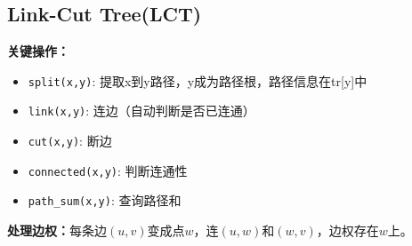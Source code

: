 \documentclass[a4paper,fontset=none]{ctexart}
\begin{document}
\subsection{Link-Cut Tree(LCT)}
\textbf{关键操作：}
\begin{itemize}
\item \texttt{split(x,y)}: 提取x到y路径，y成为路径根，路径信息在tr[y]中
\item \texttt{link(x,y)}: 连边（自动判断是否已连通）
\item \texttt{cut(x,y)}: 断边
\item \texttt{connected(x,y)}: 判断连通性
\item \texttt{path\_sum(x,y)}: 查询路径和
\end{itemize}

\textbf{处理边权：}每条边$(u,v)$变成点$w$，连$(u,w)$和$(w,v)$，边权存在$w$上。
\end{document}
